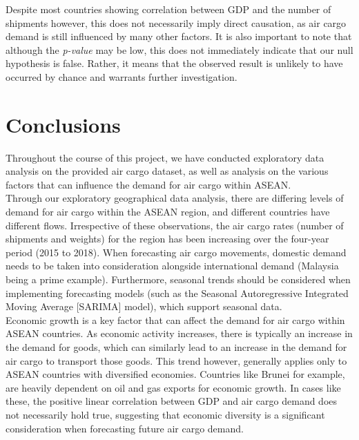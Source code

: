 \documentclass{article}
\begin{document}
\noindent Despite most countries showing correlation between GDP and the number of shipments however, this does not necessarily imply direct causation, as air cargo demand is still influenced by many other factors. It is also important to note that although the \textit{p-value} may be low, this does not immediately indicate that our null hypothesis is false. Rather, it means that the observed result is unlikely to have occurred by chance and warrants further investigation.

\section{Conclusions}
Throughout the course of this project, we have conducted exploratory data analysis on the provided air cargo dataset, as well as analysis on the various factors that can influence the demand for air cargo within ASEAN. \\

\noindent Through our exploratory geographical data analysis, there are differing levels of demand for air cargo within the ASEAN region, and different countries have different flows. Irrespective of these observations, the air cargo rates (number of shipments and weights) for the region has been increasing over the four-year period (2015 to 2018). When forecasting air cargo movements, domestic demand needs to be taken into consideration alongside international demand (Malaysia being a prime example). Furthermore, seasonal trends should be considered when implementing forecasting models (such as the Seasonal Autoregressive Integrated Moving Average [SARIMA] model), which support seasonal data. \\

\noindent Economic growth is a key factor that can affect the demand for air cargo within ASEAN countries. As economic activity increases, there is typically an increase in the demand for goods, which can similarly lead to an increase in the demand for air cargo to transport those goods. This trend however, generally applies only to ASEAN countries with diversified economies. Countries like Brunei for example, are heavily dependent on oil and gas exports for economic growth. In cases like these, the positive linear correlation between GDP and air cargo demand does not necessarily hold true, suggesting that economic diversity is a significant consideration when forecasting future air cargo demand. \\
\end{document}

